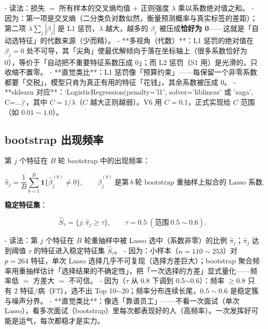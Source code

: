 \documentclass{internal-report}
\begin{document}
- 读法：损失 $=$ 所有样本的交叉熵均值 $+$ 正则强度 $\lambda$ 乘以系数绝对值之和。
- 因为：第一项是交叉熵（二分类负对数似然，衡量预测概率与真实标签的差距）；第二项 $\lambda\sum_j|\beta_j|$ 是 L1 惩罚，$\lambda$ 越大，越多的 $\beta_j$ 被压成\textbf{恰好为 0}——这就是「自动选特征」的代数来源（少而精）。
- **多视角（代数）**：L1 惩罚的绝对值在 $\beta_j=0$ 处不可导，其「尖角」使最优解倾向于落在坐标轴上（很多系数恰好为 0），等价于「自动把不重要特征系数压成 0」；而 L2 惩罚（S1 用）是光滑的，只收缩不置零。
- **直觉类比**：L1 惩罚像「预算约束」——每保留一个非零系数都要「交税」，模型只肯为真正有用的特征「花钱」，其余系数被压成 0。
- **sklearn 对应**：`LogisticRegression(penalty='l1', solver='liblinear' 或 'saga', C=...)`，其中 $C=1/\lambda$（$C$ 越大正则越弱）。V6 用 $C=0.1$，正式实现给 $C$ 范围（如 $0.01\sim1.0$）。

\subsection{bootstrap 出现频率}
\label{sec:bootstrap}

第 $j$ 个特征在 $B$ 轮 bootstrap 中的出现频率：

\begin{equation}
  \hat{\pi}_j = \frac{1}{B}\sum_{b=1}^{B}\mathbf{1}\{\hat{\beta}_j^{(b)}\neq 0\},
  \qquad
  \hat{\beta}_j^{(b)}\ \text{是第}\ b\ \text{轮 bootstrap 重抽样上拟合的 Lasso 系数}.
  \label{eq:freq}
\end{equation}

\textbf{稳定特征集}：

\begin{equation}
  \hat{S}_\tau = \big\{ j : \hat{\pi}_j \geq \tau \big\},
  \qquad
  \tau = 0.5\ (\text{范围}\ 0.5\sim0.6).
  \label{eq:stable}
\end{equation}

- 读法：第 $j$ 个特征在 $B$ 轮重抽样中被 Lasso 选中（系数非零）的比例 $\hat{\pi}_j$；$\hat{\pi}_j$ 达到阈值 $\tau$ 的特征进入稳定特征集 $\hat{S}_\tau$。
- 因为：小样本（$n=110\sim253$）对 $p=264$ 特征，单次 Lasso 选择几乎不可复现（选择方差巨大）；bootstrap 聚合频率用重抽样估计「选择结果的不确定性」，把「一次选择的方差」显式量化——频率低 $=$ 方差大 $=$ 不可信。
- 因为（$\tau$ 从 0.8 下调到 0.5$\sim$0.6）：频率 $\geq 0.8$ 只有 2 特征/病（F7），选不出 Top 10$\sim$20；频率分布连续长尾，$0.5\sim0.6$ 是稳定簇与噪声分界。
- **直觉类比**：像选「靠谱员工」——不看一次面试（单次 Lasso），看多次面试（bootstrap）里每次都表现好的人（高频率）。一次发挥好可能是运气，每次都稳才是实力。
\end{document}

